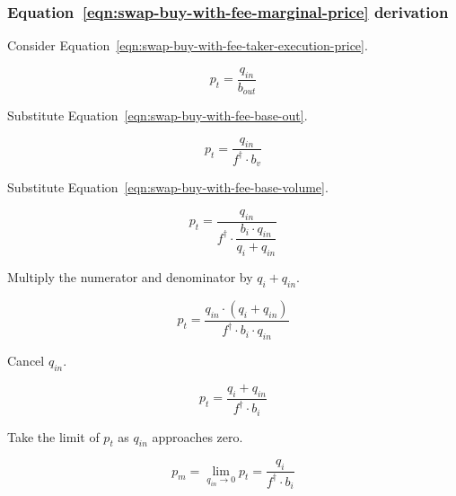\subsubsection{Equation~\ref{eqn:swap-buy-with-fee-marginal-price} derivation}%
\label{sssec:equation-eqn-swap-buy-with-fee-marginal-price-derivation}

Consider Equation~\ref{eqn:swap-buy-with-fee-taker-execution-price}.

\begin{equation*}
	p_t = \frac{q_{in}}{b_{out}}
\end{equation*}

Substitute Equation~\ref{eqn:swap-buy-with-fee-base-out}.

\begin{equation*}
	p_t = \frac{q_{in}}{f^{\dagger} \cdot b_v}
\end{equation*}

Substitute Equation~\ref{eqn:swap-buy-with-fee-base-volume}.

\begin{equation*}
	p_t = \frac{q_{in}}{f^{\dagger} \cdot \dfrac{b_i \cdot q_{in}}{q_i + q_{in}}}
\end{equation*}

Multiply the numerator and denominator by $q_i + q_{in}$.

\begin{equation*}
	p_t = \frac{q_{in} \cdot (q_i + q_{in})}{f^{\dagger} \cdot b_i \cdot q_{in}}
\end{equation*}

Cancel $q_{in}$.

\begin{equation*}
	p_t = \frac{q_i + q_{in}}{f^{\dagger} \cdot b_i}
\end{equation*}

Take the limit of $p_t$ as $q_{in}$ approaches zero.

\begin{equation}
	p_m = \lim_{q_{in} \to 0} p_t = \frac{q_i}{f^{\dagger} \cdot b_i} \nonumber
\end{equation}
